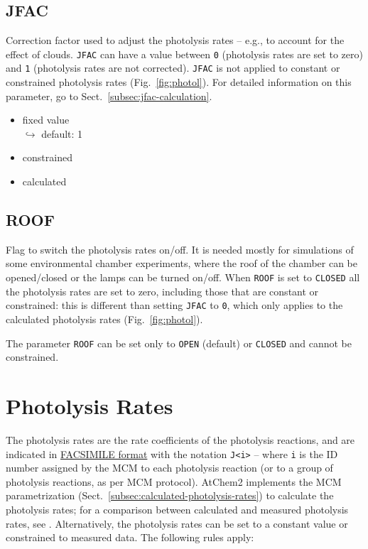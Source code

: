 \subsection{JFAC} \label{subsec:jfac}

Correction factor used to adjust the photolysis rates -- e.g., to
account for the effect of clouds. \texttt{JFAC} can have a value
between \texttt{0} (photolysis rates are set to zero) and \texttt{1}
(photolysis rates are not corrected). \texttt{JFAC} is not applied to
constant or constrained photolysis rates (Fig.~\ref{fig:photol}). For
detailed information on this parameter, go to
Sect.~\ref{subsec:jfac-calculation}.

\begin{itemize}
\item fixed value\\$\hookrightarrow$ default: 1
\item constrained
\item calculated
\end{itemize}

\subsection{ROOF} \label{subsec:roof}

Flag to switch the photolysis rates on/off. It is needed mostly for
simulations of some environmental chamber experiments, where the roof
of the chamber can be opened/closed or the lamps can be turned on/off.
When \texttt{ROOF} is set to \texttt{CLOSED} all the photolysis rates
are set to zero, including those that are constant or constrained:
this is different than setting \texttt{JFAC} to \texttt{0}, which only
applies to the calculated photolysis rates (Fig.~\ref{fig:photol}).

The parameter \texttt{ROOF} can be set only to \texttt{OPEN} (default)
or \texttt{CLOSED} and cannot be constrained.

\section{Photolysis Rates} \label{sec:photolysis-rates}

The photolysis rates are the rate coefficients of the photolysis reactions,
and are indicated in \hyperref[subsec:facsimile-format]{FACSIMILE format}
with the notation \texttt{J<i>} -- where \texttt{i} is the ID number
assigned by the MCM to each photolysis reaction (or to a group of
photolysis reactions, as per MCM protocol). AtChem2 implements the MCM
parametrization (Sect.~\ref{subsec:calculated-photolysis-rates}) to
calculate the photolysis rates; for a comparison between calculated
and measured photolysis rates, see \citet{sommariva_2020}.
Alternatively, the photolysis rates can be set to a constant value or
constrained to measured data. The following rules apply:

